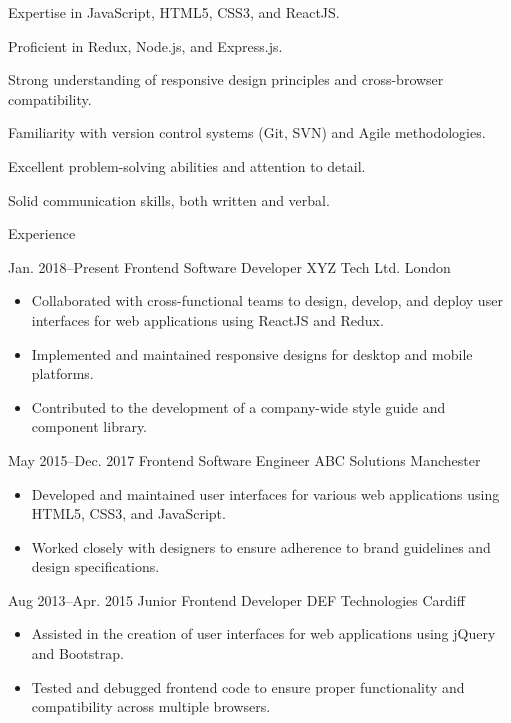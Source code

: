 \documentclass{londoncv}
\begin{document}
\maketitle

\skills
{
	\item Expertise in JavaScript, HTML5, CSS3, and ReactJS.
	\item Proficient in Redux, Node.js, and Express.js.
	\item Strong understanding of responsive design principles and cross-browser compatibility.
}
{
	\item Familiarity with version control systems (Git, SVN) and Agile methodologies.
	\item Excellent problem-solving abilities and attention to detail.
	\item Solid communication skills, both written and verbal.
}

\begin{cvcontainer}{Experience}



	\chronologicalitem
	{Jan. 2018--Present}
	{Frontend Software Developer}
	{XYZ Tech Ltd.}
	{London}
	{
	\begin{itemize}
		\item Collaborated with cross-functional teams to design, develop, and deploy user interfaces for web applications using ReactJS and Redux.
		\item Implemented and maintained responsive designs for desktop and mobile platforms.
		\item Contributed to the development of a company-wide style guide and component library.
	\end{itemize}
	}

	\chronologicalitem
	{May 2015--Dec. 2017}
	{Frontend Software Engineer}
	{ABC Solutions}
	{Manchester}
	{
	\begin{itemize}
		\item Developed and maintained user interfaces for various web applications using HTML5, CSS3, and JavaScript.
		\item Worked closely with designers to ensure adherence to brand guidelines and design specifications.
	\end{itemize}
	}

	\chronologicalitem
	{Aug 2013--Apr. 2015}
	{Junior Frontend Developer}
	{DEF Technologies}
	{Cardiff}
	{
	\begin{itemize}
		\item Assisted in the creation of user interfaces for web applications using jQuery and Bootstrap.
        	\item Tested and debugged frontend code to ensure proper functionality and compatibility across multiple browsers.
	\end{itemize}
	}
\end{cvcontainer}
\end{document}
